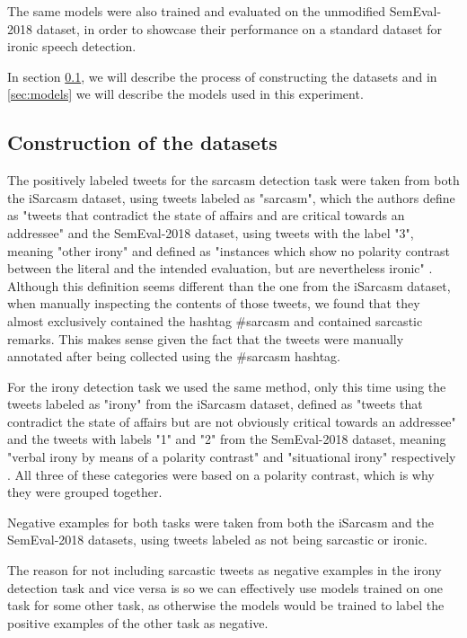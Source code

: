 \documentclass[10pt, a4paper]{article}
\begin{document}
The same models were also trained and evaluated on the unmodified SemEval-2018 dataset, in order to showcase their performance
on a standard dataset for ironic speech detection.

In section \ref{sec:dataset_construction}, we will describe the process of constructing the datasets and in \ref{sec:models}
we will describe the models used in this experiment.

\subsection{Construction of the datasets}\label{sec:dataset_construction}

The positively labeled tweets for the sarcasm detection task were taken from both the iSarcasm dataset, using tweets labeled
as "sarcasm", which the authors define as "tweets that contradict the state of affairs and are critical towards an addressee"
\citep{iSarcasm} and the SemEval-2018 dataset, using tweets with the label "3", meaning "other irony" and defined as "instances
which show no polarity contrast between the literal and the intended evaluation, but are nevertheless ironic" 
\citep{semeval-2018}. Although this definition seems different than the one from the iSarcasm dataset, when manually
inspecting the contents of those tweets, we found that they almost exclusively contained the hashtag \#sarcasm and contained
sarcastic remarks. This makes sense given the fact that the tweets were manually annotated after being collected using the
\#sarcasm hashtag.

For the irony detection task we used the same method, only this time using the tweets labeled as "irony" from the iSarcasm
dataset, defined as "tweets that contradict the state of affairs but are not obviously critical towards an
addressee" \citep{iSarcasm} and the tweets with labels "1" and "2" from the SemEval-2018 dataset, meaning "verbal irony by means 
of a polarity contrast" and "situational irony" respectively \citep{semeval-2018}. All three of these categories were based
on a polarity contrast, which is why they were grouped together.

Negative examples for both tasks were taken from both the iSarcasm and the SemEval-2018 datasets, using tweets labeled as
not being sarcastic or ironic.

The reason for not including sarcastic tweets as negative examples in the irony detection task and vice versa is so we
can effectively use models trained on one task for some other task, as otherwise the models would be trained
to label the positive examples of the other task as negative.
\end{document}
